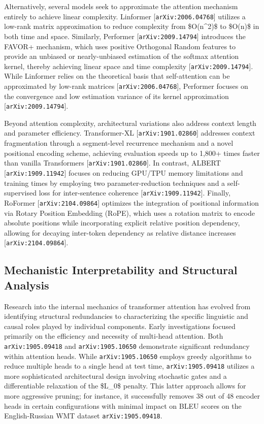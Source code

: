 \documentclass[11pt]{article}
\begin{document}
Alternatively, several models seek to approximate the attention mechanism entirely to achieve linear complexity. Linformer [\texttt{arXiv:2006.04768}] utilizes a low-rank matrix approximation to reduce complexity from \$O(n\textasciicircum{}2)\$ to \$O(n)\$ in both time and space. Similarly, Performer [\texttt{arXiv:2009.14794}] introduces the FAVOR+ mechanism, which uses positive Orthogonal Random features to provide an unbiased or nearly-unbiased estimation of the softmax attention kernel, thereby achieving linear space and time complexity [\texttt{arXiv:2009.14794}]. While Linformer relies on the theoretical basis that self-attention can be approximated by low-rank matrices [\texttt{arXiv:2006.04768}], Performer focuses on the convergence and low estimation variance of its kernel approximation [\texttt{arXiv:2009.14794}].

Beyond attention complexity, architectural variations also address context length and parameter efficiency. Transformer-XL [\texttt{arXiv:1901.02860}] addresses context fragmentation through a segment-level recurrence mechanism and a novel positional encoding scheme, achieving evaluation speeds up to 1,800+ times faster than vanilla Transformers [\texttt{arXiv:1901.02860}]. In contrast, ALBERT [\texttt{arXiv:1909.11942}] focuses on reducing GPU/TPU memory limitations and training times by employing two parameter-reduction techniques and a self-supervised loss for inter-sentence coherence [\texttt{arXiv:1909.11942}]. Finally, RoFormer [\texttt{arXiv:2104.09864}] optimizes the integration of positional information via Rotary Position Embedding (RoPE), which uses a rotation matrix to encode absolute positions while incorporating explicit relative position dependency, allowing for decaying inter-token dependency as relative distance increases [\texttt{arXiv:2104.09864}].

\subsection{Mechanistic Interpretability and Structural Analysis}

Research into the internal mechanics of transformer attention has evolved from identifying structural redundancies to characterizing the specific linguistic and causal roles played by individual components. Early investigations focused primarily on the efficiency and necessity of multi-head attention. Both \texttt{arXiv:1905.09418} and \texttt{arXiv:1905.10650} demonstrate significant redundancy within attention heads. While \texttt{arXiv:1905.10650} employs greedy algorithms to reduce multiple heads to a single head at test time, \texttt{arXiv:1905.09418} utilizes a more sophisticated architectural design involving stochastic gates and a differentiable relaxation of the \$L\_0\$ penalty. This latter approach allows for more aggressive pruning; for instance, it successfully removes 38 out of 48 encoder heads in certain configurations with minimal impact on BLEU scores on the English-Russian WMT dataset \texttt{arXiv:1905.09418}.
\end{document}
